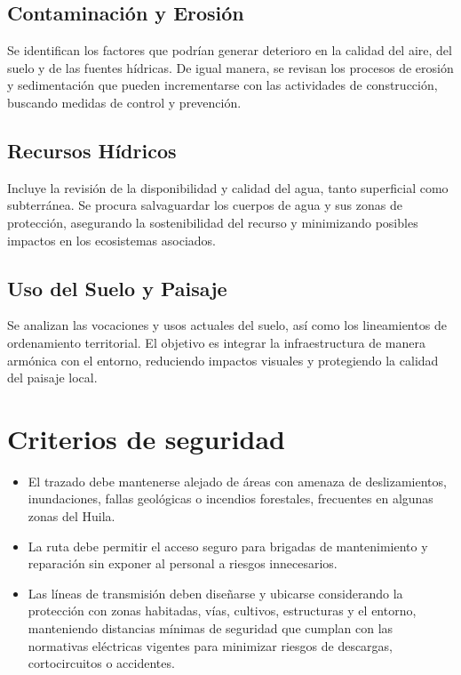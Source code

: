 \subsection{Contaminación y Erosión}
Se identifican los factores que podrían generar deterioro en la calidad del aire, del suelo y de las fuentes hídricas. De igual manera, se revisan los procesos de erosión y sedimentación que pueden incrementarse con las actividades de construcción, buscando medidas de control y prevención.

\subsection{Recursos Hídricos}
Incluye la revisión de la disponibilidad y calidad del agua, tanto superficial como subterránea. Se procura salvaguardar los cuerpos de agua y sus zonas de protección, asegurando la sostenibilidad del recurso y minimizando posibles impactos en los ecosistemas asociados.

\subsection{Uso del Suelo y Paisaje}
Se analizan las vocaciones y usos actuales del suelo, así como los lineamientos de ordenamiento territorial. El objetivo es integrar la infraestructura de manera armónica con el entorno, reduciendo impactos visuales y protegiendo la calidad del paisaje local.


\section*{Criterios de seguridad}
\begin{itemize}
    \item El trazado debe mantenerse alejado de áreas con amenaza de deslizamientos, inundaciones, fallas geológicas o incendios forestales, frecuentes en algunas zonas del Huila.
    
    \item La ruta debe permitir el acceso seguro para brigadas de mantenimiento y reparación sin exponer al personal a riesgos innecesarios.
    
    \item Las líneas de transmisión deben diseñarse y ubicarse considerando la protección con zonas habitadas, vías, cultivos, estructuras y el entorno, manteniendo distancias mínimas de seguridad que cumplan con las normativas eléctricas vigentes para minimizar riesgos de descargas, cortocircuitos o accidentes.
\end{itemize}